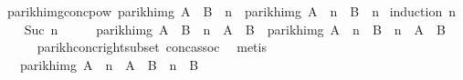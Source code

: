 \begin{isabellebody}
\ parikh{\isacharunderscore}{\kern0pt}img{\isacharunderscore}{\kern0pt}conc{\isacharunderscore}{\kern0pt}pow{\isacharcolon}{\kern0pt}\ {\isachardoublequoteopen}parikh{\isacharunderscore}{\kern0pt}img\ {\isacharparenleft}{\kern0pt}{\isacharparenleft}{\kern0pt}A\ {\isacharat}{\kern0pt}{\isacharat}{\kern0pt}\ B{\isacharparenright}{\kern0pt}\ {\isacharcircum}{\kern0pt}{\isacharcircum}{\kern0pt}\ n{\isacharparenright}{\kern0pt}\ {\isasymsubseteq}\ parikh{\isacharunderscore}{\kern0pt}img\ {\isacharparenleft}{\kern0pt}A\ {\isacharcircum}{\kern0pt}{\isacharcircum}{\kern0pt}\ n\ {\isacharat}{\kern0pt}{\isacharat}{\kern0pt}\ B\ {\isacharcircum}{\kern0pt}{\isacharcircum}{\kern0pt}\ n{\isacharparenright}{\kern0pt}{\isachardoublequoteclose}\isanewline
%
\isadelimproof
%
\endisadelimproof
%
\isatagproof
{}\isamarkupfalse%
\ {\isacharparenleft}{\kern0pt}induction\ n{\isacharparenright}{\kern0pt}\isanewline
\ \ \isamarkupfalse%
\ {\isacharparenleft}{\kern0pt}Suc\ n{\isacharparenright}{\kern0pt}\isanewline
\ \ \isamarkupfalse%
\ \isamarkupfalse%
\ {\isachardoublequoteopen}parikh{\isacharunderscore}{\kern0pt}img\ {\isacharparenleft}{\kern0pt}{\isacharparenleft}{\kern0pt}A\ {\isacharat}{\kern0pt}{\isacharat}{\kern0pt}\ B{\isacharparenright}{\kern0pt}\ {\isacharcircum}{\kern0pt}{\isacharcircum}{\kern0pt}\ n\ {\isacharat}{\kern0pt}{\isacharat}{\kern0pt}\ A\ {\isacharat}{\kern0pt}{\isacharat}{\kern0pt}\ B{\isacharparenright}{\kern0pt}\ {\isasymsubseteq}\ parikh{\isacharunderscore}{\kern0pt}img\ {\isacharparenleft}{\kern0pt}A\ {\isacharcircum}{\kern0pt}{\isacharcircum}{\kern0pt}\ n\ {\isacharat}{\kern0pt}{\isacharat}{\kern0pt}\ B\ {\isacharcircum}{\kern0pt}{\isacharcircum}{\kern0pt}\ n\ {\isacharat}{\kern0pt}{\isacharat}{\kern0pt}\ A\ {\isacharat}{\kern0pt}{\isacharat}{\kern0pt}\ B{\isacharparenright}{\kern0pt}{\isachardoublequoteclose}\isanewline
\ \ \ \ \isamarkupfalse%
\ parikh{\isacharunderscore}{\kern0pt}conc{\isacharunderscore}{\kern0pt}right{\isacharunderscore}{\kern0pt}subset\ conc{\isacharunderscore}{\kern0pt}assoc\ \isamarkupfalse%
\ metis\isanewline
\ \ \isamarkupfalse%
\ \isamarkupfalse%
\ {\isachardoublequoteopen}{\isasymdots}\ {\isacharequal}{\kern0pt}\ parikh{\isacharunderscore}{\kern0pt}img\ {\isacharparenleft}{\kern0pt}A\ {\isacharcircum}{\kern0pt}{\isacharcircum}{\kern0pt}\ n\ {\isacharat}{\kern0pt}{\isacharat}{\kern0pt}\ A\ {\isacharat}{\kern0pt}{\isacharat}{\kern0pt}\ B\ {\isacharcircum}{\kern0pt}{\isacharcircum}{\kern0pt}\ n\ {\isacharat}{\kern0pt}{\isacharat}{\kern0pt}\ B{\isacharparenright}{\kern0pt}{\isachardoublequoteclose}\isanewline

\end{isabellebody}
